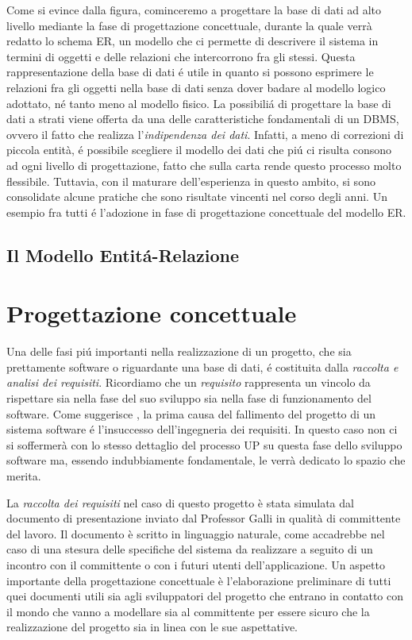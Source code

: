 \documentclass[12pt,a4paper,onecolumn]{article}
\begin{document}
Come si evince dalla figura, cominceremo a progettare la base di dati ad alto livello mediante la fase di progettazione concettuale, durante la quale verrà redatto lo schema ER, un modello che ci permette di descrivere il sistema in termini di oggetti e delle relazioni che intercorrono fra gli stessi. Questa rappresentazione della base di dati \'{e} utile in quanto si possono  esprimere le relazioni fra gli oggetti nella base di dati senza dover badare al modello logico adottato, n\'{e} tanto meno al modello fisico.\newline
La possibili\'{a} di progettare la base di dati a strati viene offerta da una delle caratteristiche fondamentali di un DBMS, ovvero il fatto che realizza l'\textit{indipendenza dei dati}. Infatti, a meno di correzioni di piccola entità, \'{e} possibile scegliere il modello dei dati che pi\'{u} ci risulta consono ad ogni livello di progettazione, fatto che sulla carta rende questo processo molto flessibile. Tuttavia, con il maturare dell'esperienza in questo ambito, si sono consolidate alcune pratiche che sono risultate vincenti nel corso degli anni. Un esempio fra tutti \'{e} l'adozione in fase di progettazione concettuale del modello ER.

\subsection{Il Modello Entit\'{a}-Relazione}

\newpage


\section{Progettazione concettuale}

	Una delle fasi pi\'{u} importanti nella realizzazione di un progetto, che sia prettamente software o riguardante una base di dati, \'{e} costituita dalla \textit{raccolta e analisi dei requisiti}. Ricordiamo che un \textit{requisito} rappresenta un vincolo da rispettare sia nella fase del suo sviluppo sia nella fase di funzionamento del software. Come suggerisce \cite{Arlow}, la prima causa del fallimento del progetto di un sistema software \'{e} l'insuccesso dell'ingegneria dei requisiti. In questo caso non ci si soffermerà con lo stesso dettaglio del processo UP su questa fase dello sviluppo software ma, essendo indubbiamente fondamentale, le verrà dedicato lo spazio che merita.
	\newline
	
	La \textit{raccolta dei requisiti} nel caso di questo progetto è stata simulata dal documento di presentazione inviato dal Professor Galli in qualità di committente del lavoro. Il documento è scritto in linguaggio naturale, come accadrebbe nel caso di una stesura delle  specifiche del sistema da realizzare a seguito di un incontro con il committente o con i futuri utenti dell'applicazione.
	Un aspetto importante della progettazione concettuale è l'elaborazione preliminare di tutti quei documenti utili sia agli sviluppatori del progetto che entrano in contatto con il mondo che vanno a modellare sia al committente per essere sicuro che la realizzazione del progetto sia in linea con le sue aspettative. 
	\newline
\end{document}
